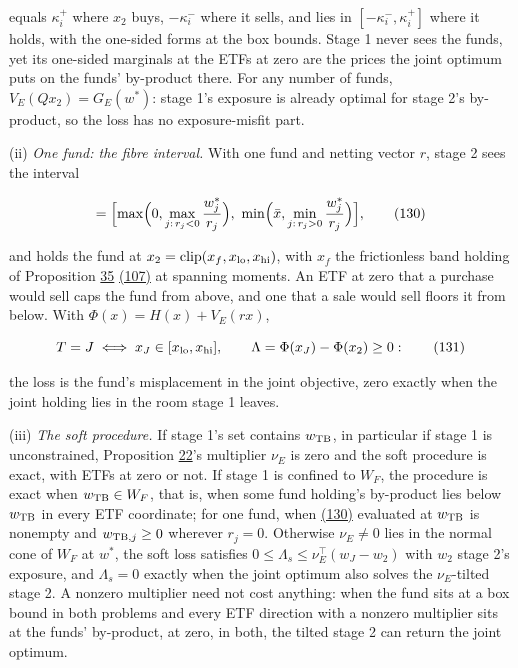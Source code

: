 \documentclass[11pt]{article}
\begin{document}
equals \(\kappa^+_i\) where \(x_2\) buys, \(-\kappa^-_i\) where it sells, and lies in
\([-\kappa^-_i,\kappa^+_i]\) where it holds, with the one-sided forms at the box
bounds. Stage 1 never sees the funds, yet its one-sided marginals at
the ETFs at zero are the prices the joint optimum puts on the funds'
by-product there. For any number of funds, \(V_E(Qx_2)=G_E(w^*)\): stage 1's
exposure is already optimal for stage 2's by-product, so the loss has
no exposure-misfit part.

(ii) \emph{One fund: the fibre interval.} With one fund and netting vector
\(r\), stage 2 sees the interval

\begin{equation*}
[x_{\rm lo},x_{\rm hi}]=\Bigl[\max\Bigl(0,\max_{j:\,r_j<0}\frac{w^*_j}{r_j}\Bigr),\
\min\Bigl(\bar x,\min_{j:\,r_j>0}\frac{w^*_j}{r_j}\Bigr)\Bigr],\tag{130}\label{eq:130}
\end{equation*}

and holds the fund at \(x_2=\mathrm{clip}(x_f,x_{\rm lo},x_{\rm hi})\), with \(x_f\) the
frictionless band holding of Proposition \hyperref[res:Proposition-35]{35} \hyperref[eq:107]{(107)} at spanning moments.
An ETF at zero that a purchase would sell caps the fund from above,
and one that a sale would sell floors it from below. With
\(\Phi(x)=H(x)+V_E(rx)\),

\begin{equation*}
T=J\iff x_J\in[x_{\rm lo},x_{\rm hi}],\qquad \Lambda=\Phi(x_J)-\Phi(x_2)\geq0:\tag{131}\label{eq:131}
\end{equation*}

the loss is the fund's misplacement in the joint objective, zero
exactly when the joint holding lies in the room stage 1 leaves.

(iii) \emph{The soft procedure.} If stage 1's set contains \(w_{\rm TB}\), in
particular if stage 1 is unconstrained, Proposition \hyperref[res:Proposition-22]{22}'s multiplier
\(\nu_E\) is zero and the soft procedure is exact, with ETFs at zero or not.
If stage 1 is confined to \(W_F\), the procedure is exact when \(w_{\rm TB}\in W_F\),
that is, when some fund holding's by-product lies below \(w_{\rm TB}\) in every
ETF coordinate; for one fund, when \hyperref[eq:130]{(130)} evaluated at \(w_{\rm TB}\) is nonempty
and \(w_{{\rm TB},j}\geq0\) wherever \(r_j=0\). Otherwise \(\nu_E\neq0\) lies in the normal
cone of \(W_F\) at \(w^*\), the soft loss satisfies \(0\leq\Lambda_s\leq\nu_E^\top(w_J-w_2)\) with
\(w_2\) stage 2's exposure, and \(\Lambda_s=0\) exactly when the joint optimum also
solves the \(\nu_E\)-tilted stage 2. A nonzero multiplier need not cost
anything: when the fund sits at a box bound in both problems and
every ETF direction with a nonzero multiplier sits at the funds'
by-product, at zero, in both, the tilted stage 2 can return the joint
optimum.
\end{document}
